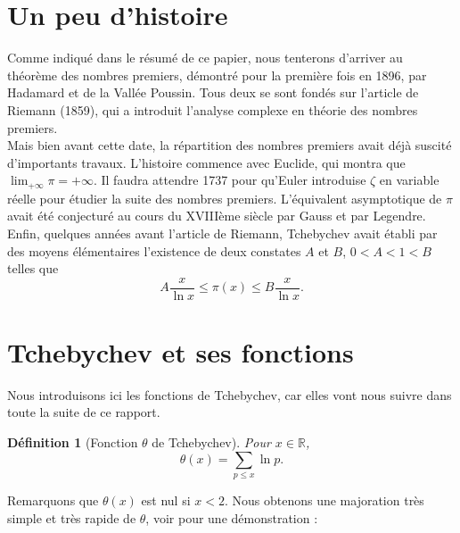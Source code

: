 \documentclass[french]{report}
\newtheorem{definition}[theorem]{Définition}
\begin{document}
\section{Un peu d'histoire}

Comme indiqué dans le résumé de ce papier, nous tenterons d'arriver au théorème des nombres premiers, démontré pour la première fois en 1896, par Hadamard et de la Vallée Poussin. Tous deux se sont fondés sur l'article \cite{riemann} de Riemann (1859), qui a introduit l'analyse complexe en théorie des nombres premiers.
\\

Mais bien avant cette date, la répartition des nombres premiers avait déjà suscité d'importants travaux. L'histoire commence avec Euclide, qui montra que $\lim_{+\infty}\pi=+\infty$. Il faudra attendre 1737 pour qu'Euler introduise $\zeta$ en variable réelle pour étudier la suite des nombres premiers. L'équivalent asymptotique de $\pi$ avait été conjecturé au cours du XVIIIème siècle par Gauss et par Legendre. Enfin, quelques années avant l'article de Riemann, Tchebychev avait établi par des moyens élémentaires l'existence de deux constates $A$ et $B$, $0<A<1<B$ telles que
\[
  A\frac{x}{\ln x}\leq\pi(x)\leq B\frac{x}{\ln x}.
\]

\section{Tchebychev et ses fonctions}

Nous introduisons ici les fonctions de Tchebychev, car elles vont nous suivre dans toute la suite de ce rapport.

\begin{definition}[Fonction $\theta$ de Tchebychev] Pour $x\in \mathbb{R}$,
  \[ \theta(x) = \sum_{p \le x}\ln p. \]
\end{definition}

Remarquons que $\theta(x)$ est nul si $x<2$. Nous obtenons une majoration très simple et très rapide de $\theta$, voir \cite{hindry} pour une démonstration :
\end{document}
